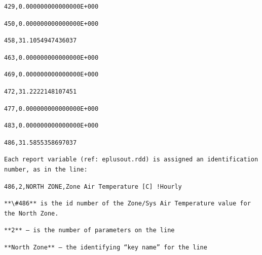 \begin{lstlisting}
429,0.000000000000000E+000
\end{lstlisting}

\begin{lstlisting}
450,0.000000000000000E+000
\end{lstlisting}

\begin{lstlisting}
458,31.1054947436037
\end{lstlisting}

\begin{lstlisting}
463,0.000000000000000E+000
\end{lstlisting}

\begin{lstlisting}
469,0.000000000000000E+000
\end{lstlisting}

\begin{lstlisting}
472,31.2222148107451
\end{lstlisting}

\begin{lstlisting}
477,0.000000000000000E+000
\end{lstlisting}

\begin{lstlisting}
483,0.000000000000000E+000
\end{lstlisting}

\begin{lstlisting}
486,31.5855358697037
\end{lstlisting}

\begin{lstlisting}
Each report variable (ref: eplusout.rdd) is assigned an identification number, as in the line:
\end{lstlisting}

\begin{lstlisting}
486,2,NORTH ZONE,Zone Air Temperature [C] !Hourly
\end{lstlisting}

\begin{lstlisting}
**\#486** is the id number of the Zone/Sys Air Temperature value for the North Zone.
\end{lstlisting}

\begin{lstlisting}
**2** – is the number of parameters on the line
\end{lstlisting}

\begin{lstlisting}
**North Zone** – the identifying “key name” for the line
\end{lstlisting}

